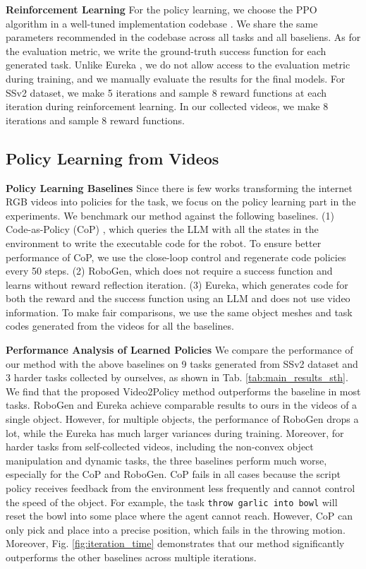 \textbf{Reinforcement Learning} For the policy learning, we choose the PPO \citep{schulman2017proximal} algorithm in a well-tuned implementation codebase \citep{rl-games2021, ma2023eureka}. We share the same parameters recommended in the codebase across all tasks and all baseliens. As for the evaluation metric, we write the ground-truth success function for each generated task. Unlike Eureka \citep{ma2023eureka}, we do not allow access to the evaluation metric during training, and we manually evaluate the results for the final models. For SSv2 dataset, we make 5 iterations and sample 8 reward functions at each iteration during reinforcement learning. In our collected videos, we make 8 iterations and sample 8 reward functions. 

\subsection{Policy Learning from Videos}
\label{sec:experiment:policy_learning}

\textbf{Policy Learning Baselines} Since there is few works transforming the internet RGB videos into policies for the task, we focus on the policy learning part in the experiments. We benchmark our method against the following baselines.
(1) Code-as-Policy (CoP) \citep{liang2023code}, which queries the LLM with all the states in the environment to write the executable code for the robot. To ensure better performance of CoP, we use the close-loop control and regenerate code policies every 50 steps. (2) RoboGen, which does not require a success function and learns without reward reflection iteration. (3) Eureka, which generates code for both the reward and the success function using an LLM and does not use video information. 
To make fair comparisons, we use the same object meshes and task codes generated from the videos for all the baselines. 

\textbf{Performance Analysis of Learned Policies} We compare the performance of our method with the above baselines on 9 tasks generated from SSv2 dataset and 3 harder tasks collected by ourselves, as shown in Tab. \ref{tab:main_results_sth}. We find that the proposed Video2Policy method outperforms the baseline in most tasks.
RoboGen \citep{wang2023robogen} and Eureka \citep{ma2023eureka} achieve comparable results to ours in the videos of a single object. However, for multiple objects, the performance of RoboGen drops a lot, while the Eureka has much larger variances during training.  
Moreover, for harder tasks from self-collected videos, including the non-convex object manipulation and dynamic tasks, the three baselines perform much worse, especially for the CoP and RoboGen. CoP fails in all cases because the script policy receives feedback from the environment less frequently and cannot control the speed of the object.
For example, the task \texttt{throw garlic into bowl} will reset the bowl into some place where the agent cannot reach. However, CoP can only pick and place into a precise position, which fails in the throwing motion. 
Moreover, Fig. \ref{fig:iteration_time} demonstrates that our method significantly outperforms the other baselines across
multiple iterations.

